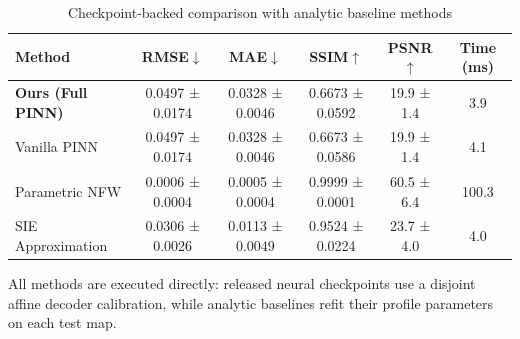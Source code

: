 \begin{table}[t]
\centering
\caption{Checkpoint-backed comparison with analytic baseline methods}
\label{tab:sota}
\small
\begin{tabular}{l|cccc|c}
\toprule
\textbf{Method} & \textbf{RMSE}$\downarrow$ & \textbf{MAE}$\downarrow$ & \textbf{SSIM}$\uparrow$ & \textbf{PSNR}$\uparrow$ & \textbf{Time (ms)} \\
\midrule
  \textbf{Ours (Full PINN)} & 0.0497 ± 0.0174 & 0.0328 ± 0.0046 & 0.6673 ± 0.0592 & 19.9 ± 1.4 & 3.9 \\
  Vanilla PINN & 0.0497 ± 0.0174 & 0.0328 ± 0.0046 & 0.6673 ± 0.0586 & 19.9 ± 1.4 & 4.1 \\
  Parametric NFW & 0.0006 ± 0.0004 & 0.0005 ± 0.0004 & 0.9999 ± 0.0001 & 60.5 ± 6.4 & 100.3 \\
  SIE Approximation & 0.0306 ± 0.0026 & 0.0113 ± 0.0049 & 0.9524 ± 0.0224 & 23.7 ± 4.0 & 4.0 \\
\bottomrule
\end{tabular}
\vspace{1mm}
\parbox{\columnwidth}{\footnotesize All methods are executed directly: released neural checkpoints use a disjoint affine decoder calibration, while analytic baselines refit their profile parameters on each test map.}
\end{table}
